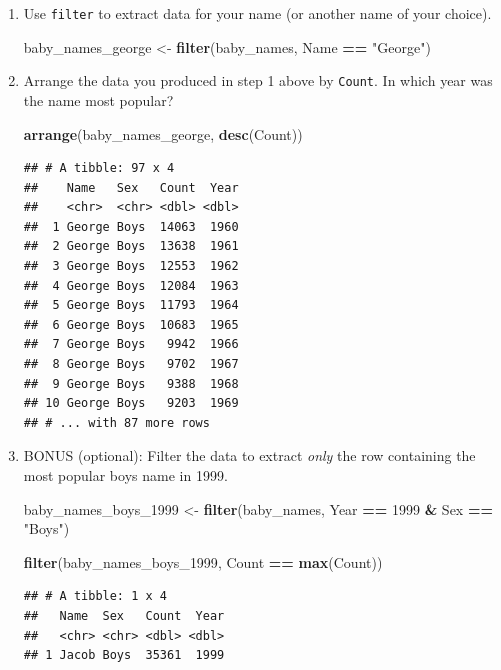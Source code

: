 \documentclass[]{book}
\newenvironment{Shaded}{\begin{snugshade}}{\end{snugshade}}
\newcommand{\KeywordTok}[1]{\textcolor[rgb]{0.13,0.29,0.53}{\textbf{#1}}}
\newcommand{\DecValTok}[1]{\textcolor[rgb]{0.00,0.00,0.81}{#1}}
\newcommand{\StringTok}[1]{\textcolor[rgb]{0.31,0.60,0.02}{#1}}
\newcommand{\OperatorTok}[1]{\textcolor[rgb]{0.81,0.36,0.00}{\textbf{#1}}}
\newcommand{\NormalTok}[1]{#1}
\begin{document}
\begin{enumerate}
\def\labelenumi{\arabic{enumi}.}
\item
  Use \texttt{filter} to extract data for your name (or another name of
  your choice).

\begin{Shaded}
\begin{Highlighting}[]
\NormalTok{baby_names_george <-}\StringTok{ }\KeywordTok{filter}\NormalTok{(baby_names, Name }\OperatorTok{==}\StringTok{ "George"}\NormalTok{)}
\end{Highlighting}
\end{Shaded}
\item
  Arrange the data you produced in step 1 above by \texttt{Count}. In
  which year was the name most popular?

\begin{Shaded}
\begin{Highlighting}[]
\KeywordTok{arrange}\NormalTok{(baby_names_george, }\KeywordTok{desc}\NormalTok{(Count))}
\end{Highlighting}
\end{Shaded}

\begin{verbatim}
## # A tibble: 97 x 4
##    Name   Sex   Count  Year
##    <chr>  <chr> <dbl> <dbl>
##  1 George Boys  14063  1960
##  2 George Boys  13638  1961
##  3 George Boys  12553  1962
##  4 George Boys  12084  1963
##  5 George Boys  11793  1964
##  6 George Boys  10683  1965
##  7 George Boys   9942  1966
##  8 George Boys   9702  1967
##  9 George Boys   9388  1968
## 10 George Boys   9203  1969
## # ... with 87 more rows
\end{verbatim}
\item
  BONUS (optional): Filter the data to extract \emph{only} the row
  containing the most popular boys name in 1999.

\begin{Shaded}
\begin{Highlighting}[]
\NormalTok{baby_names_boys_}\DecValTok{1999}\NormalTok{ <-}\StringTok{ }\KeywordTok{filter}\NormalTok{(baby_names,}
\NormalTok{                               Year }\OperatorTok{==}\StringTok{ }\DecValTok{1999} \OperatorTok{&}\StringTok{ }\NormalTok{Sex }\OperatorTok{==}\StringTok{ "Boys"}\NormalTok{)}
\end{Highlighting}
\end{Shaded}

\begin{Shaded}
\begin{Highlighting}[]
\KeywordTok{filter}\NormalTok{(baby_names_boys_}\DecValTok{1999}\NormalTok{, Count }\OperatorTok{==}\StringTok{ }\KeywordTok{max}\NormalTok{(Count))}
\end{Highlighting}
\end{Shaded}

\begin{verbatim}
## # A tibble: 1 x 4
##   Name  Sex   Count  Year
##   <chr> <chr> <dbl> <dbl>
## 1 Jacob Boys  35361  1999
\end{verbatim}
\end{enumerate}
\end{document}
